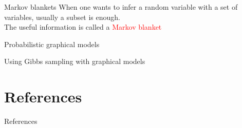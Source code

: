 \documentclass{beamer}					%
\begin{document}
\begin{frame}{Markov blankets}
When one wants to infer a random variable with a set of variables, usually a subset is enough.\\
\vspace{0.1in}
The useful information is called a \textcolor{red}{Markov blanket}
\end{frame}

\begin{frame}{Probabilistic graphical models}

\end{frame}

\begin{frame}{Using Gibbs sampling with graphical models}

\end{frame}

\section{References}

\begin{frame}[allowframebreaks]{References}
	\tiny
	
\end{frame}
\end{document}
